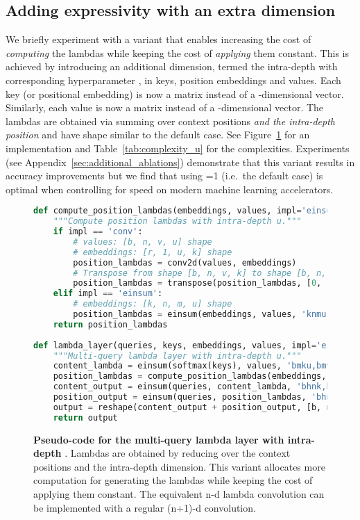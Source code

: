 \documentclass{article} \usepackage{iclr2021_conference,times}
\begin{document}
\subsection{Adding expressivity with an extra dimension\label{sec:lambda_layer_u}}
We briefly experiment with a variant that enables increasing the cost of \emph{computing} the lambdas while keeping the cost of \emph{applying} them constant.
This is achieved by introducing an additional dimension, termed the intra-depth with corresponding hyperparameter , in keys, position embeddings and values.
Each key (or positional embedding) is now a  matrix instead of a -dimensional vector.
Similarly, each value is now a  matrix instead of a -dimensional vector.
The lambdas are obtained via summing over context positions \emph{and the intra-depth position } and have   shape similar to the default case.
See Figure~\ref{fig:lambda_layer_code_u} for an implementation and Table~\ref{tab:complexity_u} for the complexities.
Experiments (see Appendix~\ref{sec:additional_ablations}) demonstrate that this variant results in accuracy
improvements but we find that using =1 (i.e.\ the default case) is optimal when controlling for speed on modern machine learning accelerators.

\begin{figure}[h]
\small
\begin{lstlisting}[language=python]
def compute_position_lambdas(embeddings, values, impl='einsum'):
    """Compute position lambdas with intra-depth u."""
    if impl == 'conv':
        # values: [b, n, v, u] shape
        # embeddings: [r, 1, u, k] shape
        position_lambdas = conv2d(values, embeddings) 
        # Transpose from shape [b, n, v, k] to shape [b, n, k, v]
        position_lambdas = transpose(position_lambdas, [0, 1, 3, 2])
    elif impl == 'einsum':
        # embeddings: [k, n, m, u] shape
        position_lambdas = einsum(embeddings, values, 'knmu,bmvu->bnkv')
    return position_lambdas
    
def lambda_layer(queries, keys, embeddings, values, impl='einsum'):
    """Multi-query lambda layer with intra-depth u."""
    content_lambda = einsum(softmax(keys), values, 'bmku,bmvu->bkv')
    position_lambdas = compute_position_lambdas(embeddings, values, lambda_conv)
    content_output = einsum(queries, content_lambda, 'bhnk,bkv->bnhv')
    position_output = einsum(queries, position_lambdas, 'bhnk,bnkv->bnhv')
    output = reshape(content_output + position_output, [b, n, d])
    return output
\end{lstlisting}
    \caption{
    \textbf{Pseudo-code for the multi-query lambda layer with intra-depth }.
    Lambdas are obtained by reducing over the context positions and the intra-depth dimension.
    This variant allocates more computation for generating the lambdas while keeping the cost of applying them constant.
    The equivalent n-d lambda convolution can be implemented with a regular (n+1)-d convolution.
    }
    \label{fig:lambda_layer_code_u}
\end{figure}
\end{document}
